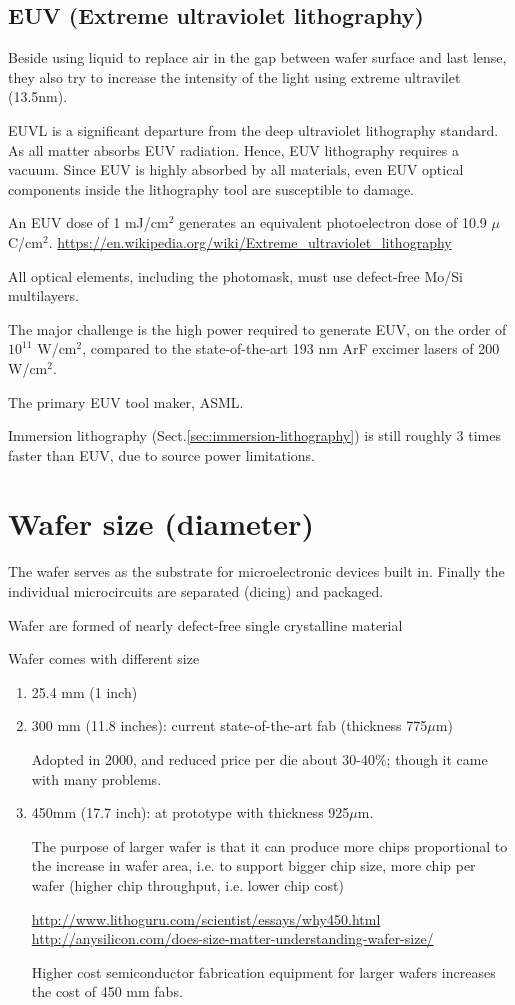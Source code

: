 \subsection{EUV (Extreme ultraviolet lithography)}

Beside using liquid to replace air in the gap between wafer surface and last
lense, they also try to increase the intensity of the light using extreme
ultravilet (13.5nm). 

EUVL is a significant departure from the deep ultraviolet lithography standard.
As all matter absorbs EUV radiation. Hence, EUV lithography requires a vacuum.
Since EUV is highly absorbed by all materials, even EUV optical components
inside the lithography tool are susceptible to damage.

An EUV dose of 1 mJ/cm$^2$ generates an equivalent photoelectron dose of 10.9
$\mu$C/cm$^2$.
\url{https://en.wikipedia.org/wiki/Extreme_ultraviolet_lithography}


All optical elements, including the photomask, must use
defect-free Mo/Si multilayers.

The major challenge is the high power required to generate EUV, on the order of
$10^{11}$ W/cm$^2$, compared to the  state-of-the-art 193 nm ArF excimer lasers
of 200 W/cm$^2$.

The primary EUV tool maker, ASML.

Immersion lithography (Sect.\ref{sec:immersion-lithography}) is still roughly 3
times faster than EUV, due to source power limitations.


\section{Wafer size (diameter)}

The wafer serves as the substrate for microelectronic devices built in.
Finally the individual microcircuits are separated (dicing) and packaged.


Wafer are formed of nearly defect-free single crystalline material

Wafer comes with different size
\begin{enumerate}
  \item 25.4 mm (1 inch)
  
  \item 300 mm (11.8 inches): current state-of-the-art fab (thickness 775$\mu$m) 

Adopted in 2000, and reduced price per die about 30-40\%; though it came with
many problems.
  
  \item 450mm (17.7 inch): at prototype with thickness 925$\mu$m.
  
The purpose of larger wafer is that it can  produce more chips proportional to
the increase in wafer area, i.e. to support bigger chip size, more chip per
wafer (higher chip throughput, i.e. lower chip cost)

\url{http://www.lithoguru.com/scientist/essays/why450.html}
\url{http://anysilicon.com/does-size-matter-understanding-wafer-size/}

Higher cost semiconductor fabrication equipment for larger wafers increases the
cost of 450 mm fabs.
\end{enumerate}

